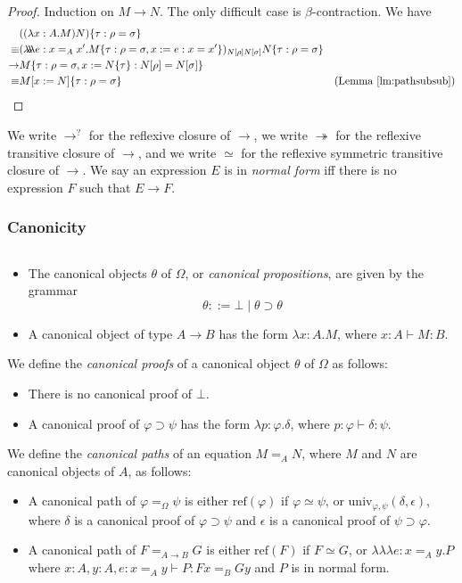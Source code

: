 \documentclass[a4paper,UKenglish]{lipics-v2016}
\newcommand*{\reff}[1]{\ensuremath{\mathrm{ref} \left( {#1} \right)}}
\newcommand*{\univ}[4]{\ensuremath{\mathrm{univ}_{{#1}, {#2}} \left({#3} , {#4} \right)}}
\newcommand*{\triplelambda}{\ensuremath{\lambda \!\! \lambda \!\! \lambda}}
\theoremstyle{plain}
\theoremstyle{definition}
\begin{document}
\begin{proof}
Induction on $M \rightarrow N$.  The only difficult case is $\beta$-contraction.  We have
\begin{align*}
& ((\lambda x:A.M)N)\{ \tau : \rho = \sigma \} \\
\equiv & (\triplelambda e : x =_A x' . M \{ \tau : \rho = \sigma, x := e : x = x' \})_{N [ \rho ] N [ \sigma ]} N \{ \tau : \rho = \sigma \} \\
\rightarrow & M \{ \tau : \rho = \sigma, x := N \{ \tau \} : N [ \rho ] = N [ \sigma ] \} \\
\equiv & M [ x := N ] \{ \tau : \rho = \sigma \} & (\text{Lemma \ref{lm:pathsubsub}})
\end{align*}
\end{proof}

We write $\rightarrow^?$ for the reflexive closure of $\rightarrow$, 
we write $\twoheadrightarrow$ for the reflexive transitive closure of $\rightarrow$, and we write $\simeq$ for the reflexive symmetric transitive closure of $\rightarrow$.
We say an expression $E$ is in \emph{normal form} iff there is no expression $F$ such that $E \rightarrow F$.

\subsubsection{Canonicity}

\begin{definition}
$ $
\begin{itemize}
\item
The canonical objects $\theta$ of $\Omega$, or \emph{canonical propositions}, are given by the grammar
\[ \theta ::= \bot \mid \theta \supset \theta \]
\item
A canonical object of type $A \rightarrow B$ has the form $\lambda x:A.M$, where
$x : A \vdash M : B$.
\end{itemize}
We define the \emph{canonical proofs} of a canonical object $\theta$ of $\Omega$ as follows:
\begin{itemize}
\item
There is no canonical proof of $\bot$.
\item
A canonical proof of $\varphi \supset \psi$ has the form $\lambda p : \varphi . \delta$, where $p : \varphi \vdash \delta : \psi$.
\end{itemize}
We define the \emph{canonical paths} of an equation $M =_A N$, where $M$ and $N$ are canonical objects of $A$, as follows:
\begin{itemize}
\item
A canonical path of $\varphi =_\Omega \psi$ is either $\reff{\varphi}$ if $\varphi \simeq \psi$, or $\univ{\varphi}{\psi}{\delta}{\epsilon}$, where $\delta$ is a canonical
proof of $\varphi \supset \psi$ and $\epsilon$ is a canonical proof of $\psi \supset \varphi$.
\item
A canonical path of $F =_{A \rightarrow B} G$ is either $\reff{F}$ if $F \simeq G$, or $\triplelambda e:x =_A y.P$ where $x : A, y : A, e : x =_A y \vdash P : Fx =_B Gy$ and $P$ is in normal form.
\end{itemize}
\end{definition}
\end{document}
